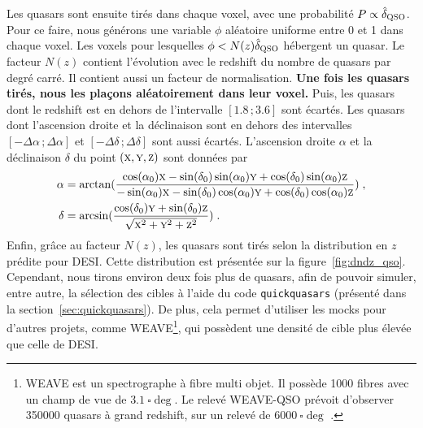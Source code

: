 Les quasars sont ensuite tirés dans chaque voxel, avec une probabilité $P \propto \hat \delta_{\textsc{QSO}}$. Pour ce faire, nous générons une variable $\phi$ aléatoire uniforme entre 0 et 1 dans chaque voxel. Les voxels pour lesquelles $\phi < N(z) \hat \delta_{\textsc{QSO}}$ hébergent un quasar.
Le facteur $N(z)$ contient l'évolution avec le redshift du nombre de quasars par degré carré. Il contient aussi un facteur de normalisation.
\textbf{
  Une fois les quasars tirés, nous les plaçons aléatoirement dans leur voxel.
}
Puis, les quasars dont le redshift est en dehors de l'intervalle $[\num{1.8}\, ; \num{3.6}]$ sont écartés.
Les quasars dont l'ascension droite et la déclinaison sont en dehors des intervalles $[ - \Delta \alpha \, ; \Delta \alpha]$ et $[ - \Delta \delta \, ; \Delta \delta]$ sont aussi écartés.
L'ascension droite $\alpha$ et la déclinaison $\delta$ du point $(\textsc{x},\textsc{y},\textsc{z})$ sont données par
\begin{align}
  \label{eq:radec}
  \alpha &= \arctan(\frac{
  \cos(\alpha_0)\textsc{x} - \sin(\delta_0)\sin(\alpha_0)\textsc{y} + \cos(\delta_0)\sin(\alpha_0)\textsc{z}
  }{
  - \sin(\alpha_0)\textsc{x} - \sin(\delta_0)\cos(\alpha_0)\textsc{y} + \cos(\delta_0)\cos(\alpha_0)\textsc{z}
           }) \; ,\\
  \delta &= \arcsin(\frac{
           \cos(\delta_0)\textsc{y} + \sin(\delta_0) \textsc{z}
           }{
           \sqrt{\textsc{x}^2 + \textsc{y}^2 + \textsc{z}^2}
           }) \; .
\end{align}
Enfin, grâce au facteur $N(z)$, les quasars sont tirés selon la distribution en $z$ prédite pour DESI. Cette distribution est présentée sur la figure~\ref{fig:dndz_qso}. Cependant, nous tirons environ deux fois plus de quasars, afin de pouvoir simuler, entre autre, la sélection des cibles à l'aide du code \texttt{quickquasars} (présenté dans la section~\ref{sec:quickquasars}). De plus, cela permet d'utiliser les mocks pour d'autres projets, comme WEAVE\footnote{WEAVE est un spectrographe à fibre multi objet. Il possède \num{1000} fibres avec un champ de vue de $\SI{3.1}{\square\deg}$. Le relevé WEAVE-QSO prévoit d'observer \num{350000} quasars à grand redshift, sur un relevé de $\SI{6000}{\square\deg}$ \autocite{Pieri2016}.}, qui possèdent une densité de cible plus élevée que celle de DESI.
